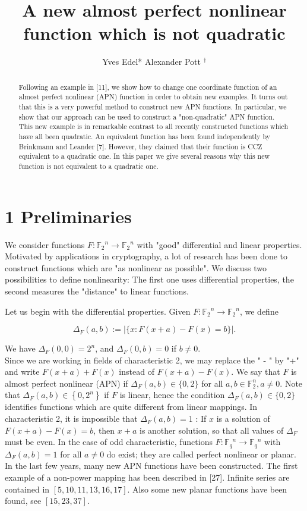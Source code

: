 \documentclass[10pt]{article}
\title{A new almost perfect nonlinear function which is not quadratic }
\author{Yves Edel* Alexander Pott ${ }^{\dagger}$}
\date{}
\begin{document}
\maketitle
\captionsetup{singlelinecheck=false}


\begin{abstract}
Following an example in [11], we show how to change one coordinate function of an almost perfect nonlinear (APN) function in order to obtain new examples. It turns out that this is a very powerful method to construct new APN functions. In particular, we show that our approach can be used to construct a "non-quadratic" APN function. This new example is in remarkable contrast to all recently constructed functions which have all been quadratic. An equivalent function has been found independently by Brinkmann and Leander [7]. However, they claimed that their function is CCZ equivalent to a quadratic one. In this paper we give several reasons why this new function is not equivalent to a quadratic one.
\end{abstract}

\section*{1 Preliminaries}
We consider functions $F: \mathbb{F}_{2}{ }^{n} \rightarrow \mathbb{F}_{2}{ }^{n}$ with "good" differential and linear properties. Motivated by applications in cryptography, a lot of research has been done to construct functions which are "as nonlinear as possible". We discuss two possibilities to define nonlinearity: The first one uses differential properties, the second measures the "distance" to linear functions.

Let us begin with the differential properties. Given $F: \mathbb{F}_{2}{ }^{n} \rightarrow \mathbb{F}_{2}{ }^{n}$, we define

$$
\Delta_{F}(a, b):=|\{x: F(x+a)-F(x)=b\}| .
$$

We have $\Delta_{F}(0,0)=2^{n}$, and $\Delta_{F}(0, b)=0$ if $b \neq 0$.\\
Since we are working in fields of characteristic 2, we may replace the " - " by "+" and write $F(x+a)+F(x)$ instead of $F(x+a)-F(x)$. We say that $F$ is almost perfect nonlinear (APN) if $\Delta_{F}(a, b) \in\{0,2\}$ for all $a, b \in \mathbb{F}_{2}^{n}, a \neq 0$. Note that $\Delta_{F}(a, b) \in\left\{0,2^{n}\right\}$ if $F$ is linear, hence the condition $\Delta_{F}(a, b) \in\{0,2\}$ identifies functions which are quite different from linear mappings. In characteristic 2, it is impossible that $\Delta_{F}(a, b)=1$ : If $x$ is a solution of $F(x+a)-F(x)=b$, then $x+a$ is another solution, so that all values of $\Delta_{F}$ must be even. In the case of odd characteristic, functions $F: \mathbb{F}_{q}{ }^{n} \rightarrow \mathbb{F}_{q}{ }^{n}$ with $\Delta_{F}(a, b)=1$ for all $a \neq 0$ do exist; they are called perfect nonlinear or planar. In the last few years, many new APN functions have been constructed. The first example of a non-power mapping has been described in [27]. Infinite series are contained in $[5,10,11,13,16,17]$. Also some new planar functions have been found, see $[15,23,37]$.
\end{document}
